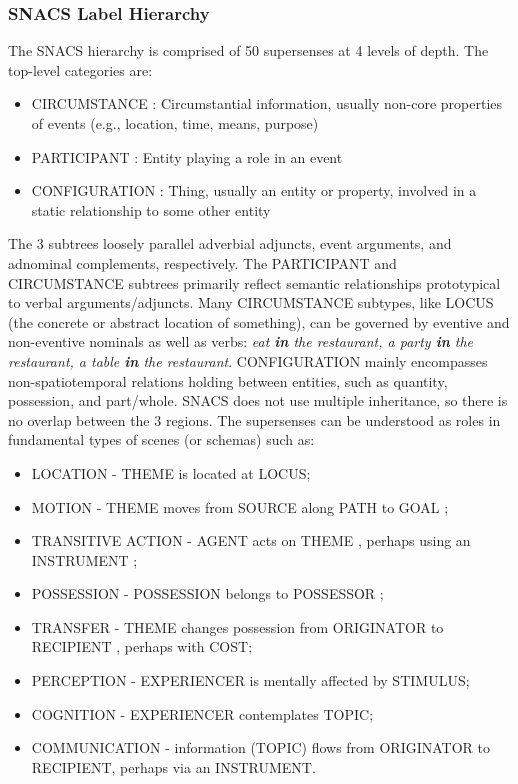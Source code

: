 \subsubsection{SNACS Label Hierarchy}

The SNACS hierarchy is comprised of 50 supersenses at 4 levels of depth. The top-level categories are:
\begin{itemize}
    \item CIRCUMSTANCE :  Circumstantial information, usually non-core properties of events (e.g., location, time, means, purpose)
    \item PARTICIPANT : Entity playing a role in an event
    \item CONFIGURATION : Thing, usually an entity or property, involved in a static relationship to some other entity
\end{itemize}

The 3 subtrees loosely parallel adverbial adjuncts, event arguments, and adnominal complements, respectively. The PARTICIPANT and CIRCUMSTANCE subtrees primarily reflect semantic relationships prototypical to verbal arguments/adjuncts. Many CIRCUMSTANCE subtypes, like LOCUS (the concrete or abstract location of something), can be governed by eventive and non-eventive nominals as well as verbs: \emph{eat \textbf{in} the restaurant, a party \textbf{in} the restaurant, a table \textbf{in} the restaurant}. CONFIGURATION mainly encompasses non-spatiotemporal relations holding between entities, such as quantity, possession, and part/whole. SNACS does not use multiple inheritance, so there is no overlap between the 3 regions. The supersenses can be understood as roles in fundamental types of scenes (or schemas) such as: 

\begin{itemize}
\item LOCATION - THEME is located at LOCUS;
\item MOTION - THEME moves from SOURCE along PATH to GOAL ;
\item TRANSITIVE ACTION - AGENT acts on THEME , perhaps using an INSTRUMENT ;
\item POSSESSION - POSSESSION belongs to POSSESSOR ;
\item TRANSFER - THEME changes possession from ORIGINATOR to RECIPIENT , perhaps with COST;
\item PERCEPTION - EXPERIENCER is mentally affected by STIMULUS; 
\item COGNITION - EXPERIENCER contemplates TOPIC;
\item COMMUNICATION - information (TOPIC) flows from ORIGINATOR to RECIPIENT, perhaps via an INSTRUMENT. 
\end{itemize}

